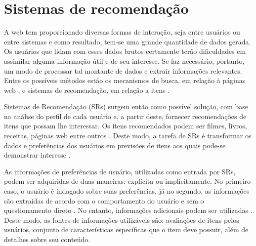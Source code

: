\chapter{Sistemas de recomendação}
\label{cap:sistemas_de_recomendacao}



A web tem proporcionado diversas formas de interação, seja entre usuários ou entre sistemas e como resultado, tem-se uma grande quantidade de dados gerada. Os usuários que lidam com esses dados brutos certamente terão dificuldades em assimilar alguma informação útil e de seu interesse. Se faz necessário, portanto, um modo de processar tal montante de dados e extrair informações relevantes. Entre os possíveis métodos estão os mecanismos de busca, em relação à páginas web \cite{Brin1998}, e sistemas de recomendação, em relação a itens .


Sistemas de Recomendação (SRs) surgem então como possível solução, com base na análise do perfil de cada usuário e, a partir deste, fornecer recomendações de itens que possam lhe interessar. Os itens recomendados podem ser filmes, livros, receitas, páginas web entre outros \cite{Bobadilla_2013}.  Deste modo, a tarefa de SRs é transformar os dados e preferências dos usuários em previsões de itens aos quais pode-se demonstrar interesse \cite{Lue2012}.



As informações de preferências de usuário, utilizadas como entrada por SRs, podem ser adquiridas de duas maneiras: explícita ou implicitamente. No primeiro caso, o usuário é indagado sobre suas preferências, já no segundo, as informações são extraídas de acordo com o comportamento do usuário e sem o questionamento direto \cite{Bobadilla_2013}. No entanto, informações adicionais podem ser utilizadas \cite{Jannach2010}. Deste modo, as fontes de informações utilizáveis são: avaliações de itens pelos usuários, conjunto de características específicas que o item deve possuir, além de detalhes sobre seu conteúdo. 

